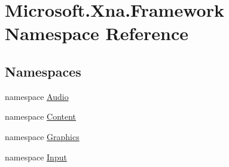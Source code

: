 \hypertarget{namespace_microsoft_1_1_xna_1_1_framework}{}\section{Microsoft.\+Xna.\+Framework Namespace Reference}
\label{namespace_microsoft_1_1_xna_1_1_framework}
\subsection*{Namespaces}
\begin{DoxyCompactItemize}
\item 
namespace \hyperlink{namespace_microsoft_1_1_xna_1_1_framework_1_1_audio}{Audio}
\item 
namespace \hyperlink{namespace_microsoft_1_1_xna_1_1_framework_1_1_content}{Content}
\item 
namespace \hyperlink{namespace_microsoft_1_1_xna_1_1_framework_1_1_graphics}{Graphics}
\item 
namespace \hyperlink{namespace_microsoft_1_1_xna_1_1_framework_1_1_input}{Input}
\end{DoxyCompactItemize}
